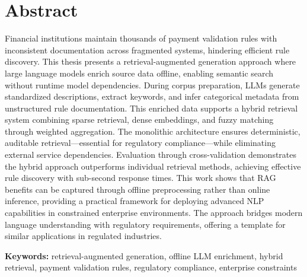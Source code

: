 \chapter*{Abstract}

Financial institutions maintain thousands of payment validation rules with inconsistent documentation across fragmented systems, hindering efficient rule discovery. This thesis presents a retrieval-augmented generation approach where large language models enrich source data offline, enabling semantic search without runtime model dependencies. During corpus preparation, LLMs generate standardized descriptions, extract keywords, and infer categorical metadata from unstructured rule documentation. This enriched data supports a hybrid retrieval system combining sparse retrieval, dense embeddings, and fuzzy matching through weighted aggregation. The monolithic architecture ensures deterministic, auditable retrieval—essential for regulatory compliance—while eliminating external service dependencies. Evaluation through cross-validation demonstrates the hybrid approach outperforms individual retrieval methods, achieving effective rule discovery with sub-second response times. This work shows that RAG benefits can be captured through offline preprocessing rather than online inference, providing a practical framework for deploying advanced NLP capabilities in constrained enterprise environments. The approach bridges modern language understanding with regulatory requirements, offering a template for similar applications in regulated industries.

\medskip
\noindent\textbf{Keywords:} retrieval-augmented generation, offline LLM enrichment, hybrid retrieval, payment validation rules, regulatory compliance, enterprise constraints